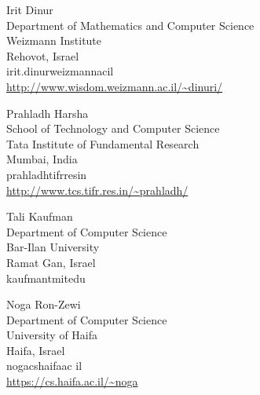 \documentclass{toc}
\theoremstyle{plain}
\begin{document}

%
%
%
%
%
%
%


%
%
%
%
%
\begin{tocauthors}
\begin{tocinfo}[dinur]
Irit Dinur\\
 Department of Mathematics and Computer Science \\
Weizmann Institute\\
Rehovot, Israel\\
 irit.dinur\tocat{}weizmann\tocdot{}ac\tocdot{}il \\   %
 \url{http://www.wisdom.weizmann.ac.il/~dinuri/}      %
\end{tocinfo}

\begin{tocinfo}[harsha]
Prahladh Harsha\\
School of Technology and Computer Science\\
Tata Institute of Fundamental Research \\
Mumbai, India\\
prahladh\tocat{}tifr\tocdot{}res\tocdot{}in\\ %
 \url{http://www.tcs.tifr.res.in/~prahladh/}      %
\end{tocinfo}

\begin{tocinfo}[kaufman]
Tali Kaufman\\
 Department of Computer Science \\
 Bar-Ilan University\\
Ramat Gan, Israel\\
kaufmant\tocat{}mit\tocdot{}edu\\  %
\end{tocinfo}

\begin{tocinfo}[ronzewi]
Noga Ron-Zewi\\
Department of Computer Science \\
University of Haifa\\
Haifa, Israel\\
noga\tocat{}cs\tocdot{}haifa\tocdot{}ac\tocdot{} il \\   %
 \url{https://cs.haifa.ac.il/~noga}      %
\end{tocinfo}

\end{tocauthors}
\end{document}
